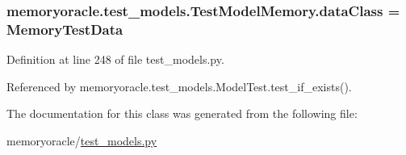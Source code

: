 \subsubsection[{data\+Class}]{\setlength{\rightskip}{0pt plus 5cm}memoryoracle.\+test\+\_\+models.\+Test\+Model\+Memory.\+data\+Class = {\bf Memory\+Test\+Data}\hspace{0.3cm}{\ttfamily [static]}}\label{classmemoryoracle_1_1test__models_1_1TestModelMemory_a3d707f88bf25d4f82f24b02b98af152a}


Definition at line 248 of file test\+\_\+models.\+py.



Referenced by memoryoracle.\+test\+\_\+models.\+Model\+Test.\+test\+\_\+if\+\_\+exists().



The documentation for this class was generated from the following file\+:\begin{DoxyCompactItemize}
\item 
memoryoracle/\hyperlink{test__models_8py}{test\+\_\+models.\+py}\end{DoxyCompactItemize}
